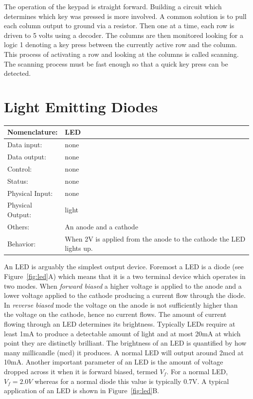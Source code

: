 The operation of the keypad is straight forward.  Building a circuit
which determines which key was pressed is more involved.   A common
solution is to pull each column output to ground via a resistor.  Then
one at a time, each row is driven to 5 volts using a decoder.  The
columns are then monitored looking for a logic 1 denoting a key press
between the currently active row and the column.  This process
of activating a row and looking at the columns is called scanning.  The
scanning process must be fast enough so that a quick key press can be 
detected.

\section{Light Emitting Diodes}
\label{page:led}
\begin{tabular}{|l|p{3.5in}|} \hline
Nomenclature: & LED \\ \hline
Data input:    & none     \\ \hline
Data output:   & none    \\ \hline
Control:       & none        \\ \hline
Status:        & none                                   \\ \hline
Physical Input:& none		\\ \hline
Physical Output:& light		\\ \hline
Others:        & An anode and a cathode                 \\ \hline
Behavior:      & When 2V is applied from the anode to the cathode the LED lights up. \\ \hline
\end{tabular}

An LED is arguably the simplest output device.  Foremost a LED
is a diode (see Figure~\ref{fig:led}A) which means that it is a 
two terminal device which operates
in two modes.  When {\it forward biased} a higher voltage is applied
to the anode and a lower voltage applied to the cathode producing a 
current flow through the diode.  In {\it reverse biased} mode the voltage
on the anode is not sufficiently higher than the voltage on the cathode,
hence no current flows.   The amount of current flowing through an LED
determines its brightness.
Typically LEDs require at least 1mA to produce a detectable
amount of light and at most 20mA at which point they are 
distinctly brilliant.  The brightness of an LED is 
quantified by how many millicandle (mcd) it produces.  A normal LED will
output around 2mcd at 10mA.  Another important parameter of an LED is the 
amount of voltage dropped across it when it is forward biased, termed $V_f$.
For a normal LED, $V_f=2.0V$ whereas for a normal diode this value is 
typically 0.7V.  A typical application of an LED is shown in 
Figure~\ref{fig:led}B.


